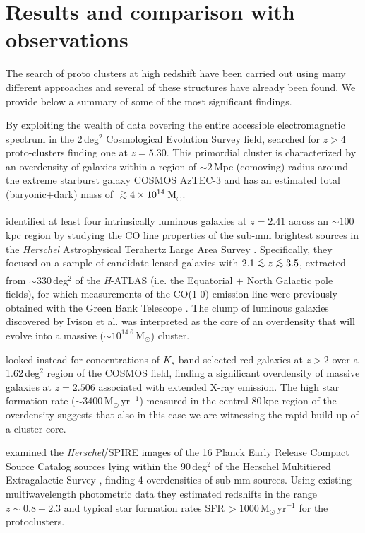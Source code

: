 \documentclass[useAMS,usenatbib]{mn2e}
\def\lsim{\,\lower2truept\hbox{${<\atop\hbox{\raise4truept\hbox{$\sim$}}}$}\,}
\def\gsim{\,\lower2truept\hbox{${> \atop\hbox{\raise4truept\hbox{$\sim$}}}$}\,}
\begin{document}
\section{Results and comparison with observations}\label{sec:results}



The search of proto clusters at high redshift have been carried out
using many different approaches and several of these structures have
already been found. We provide below a summary of some of the most
significant findings.

By exploiting the wealth of data covering the
entire accessible electromagnetic spectrum in the 2\,deg$^{2}$
Cosmological Evolution Survey \citep[COSMOS;][]{Scoville2007} field,
\cite{Capak2011}
searched for $z>4$ proto-clusters finding one at
$z=5.30$. This primordial cluster is characterized by an overdensity of
galaxies within  a region of $\sim2\,$Mpc
(comoving) radius around the extreme starburst galaxy
COSMOS AzTEC-3
and has an estimated total (baryonic+dark) mass of
$\gsim4\times10^{14}$\,M$_{\odot}$.

\citet{Ivison2013} identified at least
four intrinsically luminous galaxies at $z=2.41$ across an
$\sim100\,$kpc region by studying the CO line properties of the sub-mm
brightest sources in the
{\it Herschel} Astrophysical Terahertz Large Area Survey \citep[{\it
  H}-ATLAS;][]{Eales2010}. Specifically, they focused on a sample of
candidate lensed galaxies with $2.1\lsim z\lsim3.5$, extracted from
$\sim330\,$deg$^{2}$ of the {\it H}-ATLAS (i.e. the Equatorial $+$ North
Galactic pole fields), for which measurements of the CO(1-0) emission
line were previously obtained with
the Green Bank Telescope \citep{Harris2012}. The clump of luminous galaxies discovered by Ivison et al. was interpreted as
the core of an overdensity that will evolve into a massive
($\sim10^{14.6}\,$M$_{\odot}$) cluster.

\citet{Wang2016} looked instead for concentrations of $K_{s}$-band selected
red galaxies at $z>2$ over a 1.62\,deg$^{2}$ region of the COSMOS field, finding a significant overdensity of
massive galaxies at $z=2.506$ associated with extended X-ray
emission. The high star formation rate
($\sim3400\,$M$_{\odot}\,$yr$^{-1}$) measured in the
central 80\,kpc region of the overdensity suggests that also in this case
we are witnessing the rapid build-up of a cluster core.

\cite{Clements2014} examined the {\it Herschel}/SPIRE images of the 16
Planck Early Release Compact Source Catalog sources lying within the
90\,deg$^{2}$ of the Herschel Multitiered Extragalactic Survey \citep[HerMES;][]{Oliver12},
finding 4 overdensities of sub-mm sources. Using existing
multiwavelength photometric data they estimated redshifts in the
range $z\sim0.8-2.3$ and typical star formation rates SFR$\,>1000\,$M$_{\odot}$\,yr$^{-1}$ for
the protoclusters.
\end{document}
